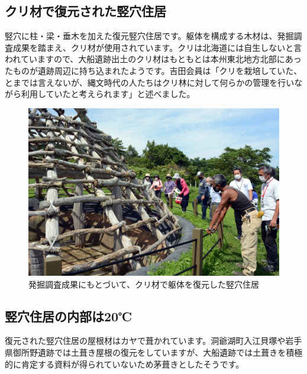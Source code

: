 \documentclass[a4j,11pt,twocolumn,openany]{jsbook}
\begin{document}
\subsection{クリ材で復元された竪穴住居}

竪穴に柱・梁・垂木を加えた復元竪穴住居です。躯体を構成する木材は、発掘調査成果を踏まえ、クリ材が使用されています。クリは北海道には自生しないと言われていますので、大船遺跡出土のクリ材はもともとは本州東北地方北部にあったものが遺跡周辺に持ち込まれたようです。吉田会員は「クリを栽培していた、とまでは言えないが、縄文時代の人たちはクリ林に対して何らかの管理を行いながら利用していたと考えられます」と述べました。

\begin{figure}[ht]
	\centering
	\includegraphics[width=\linewidth]{fig/01_Iseki_kengaku/04_Ofune_house.JPG}
	\caption{発掘調査成果にもとづいて、クリ材で躯体を復元した竪穴住居}
	\label{}
\end{figure}

\subsection{竪穴住居の内部は20℃}

復元された竪穴住居の屋根材はカヤで葺かれています。洞爺湖町入江貝塚や岩手県御所野遺跡では土葺き屋根の復元をしていますが、大船遺跡では土葺きを積極的に肯定する資料が得られていないため茅葺きとしたそうです。
\end{document}
